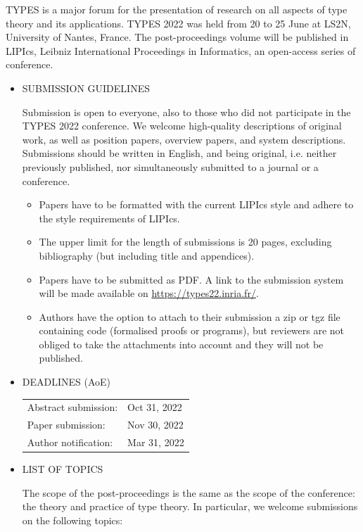 \documentclass[prodmode,acmtecs]{acmsmall} %
\begin{document}
  TYPES is a major forum for the presentation of research on all aspects of type theory and its applications. TYPES 2022 was held from 20 to 25 June at LS2N, University of Nantes, France. The post-proceedings volume will be published in LIPIcs, Leibniz International Proceedings in Informatics, an open-access series of conference.\\ 
\begin{itemize}\item  SUBMISSION GUIDELINES 
 
  Submission is open to everyone, also to those who did not participate in the TYPES 2022 conference. We welcome high-quality descriptions of original work, as well as position papers, overview papers, and system descriptions. Submissions should be written in English, and being original, i.e. neither previously published, nor simultaneously submitted to a journal or a conference. 
 
\begin{itemize}\item  Papers have to be formatted with the current LIPIcs style and adhere to the style requirements of LIPIcs. 
\item  The upper limit for the length of submissions is 20 pages, excluding bibliography (but including title and appendices). 
\item  Papers have to be submitted as PDF. A link to the submission system will be made available on \href{https://types22.inria.fr/}{https://types22.inria.fr/}. 
\item  Authors have the option to attach to their submission a zip or tgz file containing code (formalised proofs or programs), but reviewers are not obliged to take the attachments into account and they will not be published.
\end{itemize} 
\item  DEADLINES (AoE)  
 
\begin{tabulary}{\linewidth}{LL}Abstract submission:  & Oct 31, 2022 \\
Paper submission:  & Nov 30, 2022 \\
Author notification:  & Mar 31, 2022 \\
\end{tabulary}
 
\item  LIST OF TOPICS 
 
  The scope of the post-proceedings is the same as the scope of the conference: the theory and practice of type theory. In particular, we welcome submissions on the following topics: 
 

\end{itemize}
\end{document}

